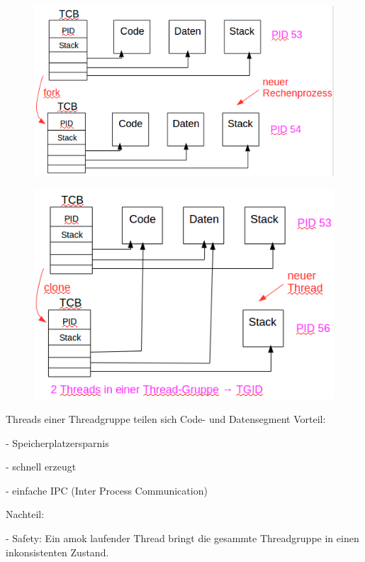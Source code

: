 \documentclass[12pt,a4paper,oneside,ngerman]{article}
\begin{document}
\begin{figure}[H]
	\centering
	\includegraphics[scale=0.8]{umlet/fork.png}
\end{figure}

\begin{figure}[H]
	\centering
	\includegraphics[scale=0.8]{umlet/clone.png}
\end{figure}

Threads einer Threadgruppe teilen sich Code- und Datensegment
Vorteil:
\begin{description}
	\item - Speicherplatzersparnis
	\item - schnell erzeugt
	\item - einfache IPC (Inter Process Communication)
\end{description}
Nachteil:
\begin{description}
	\item - Safety: Ein amok laufender Thread bringt die gesammte Threadgruppe in einen inkonsistenten Zustand.
\end{description}
\end{document}
